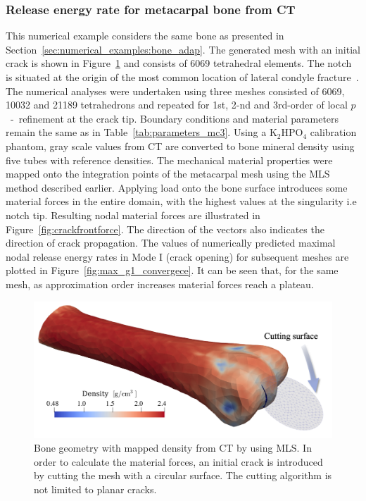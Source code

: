 \documentclass[11pt]{acmeArticle}
\numberwithin{equation}{section}
\begin{document}
\subsubsection{Release energy rate for metacarpal bone from CT}
This numerical example considers the same bone as presented in Section~\ref{sec:numerical_examples:bone_adap}. 
The generated mesh with an initial crack is shown in Figure~\ref{fig:bone_ct_mesh_cut} and consists of 6069 tetrahedral elements. 
The notch is situated at the origin of the most common location of lateral condyle fracture~\citep{jacklin2012frequency}. 
The numerical analyses were undertaken using three meshes consisted of 6069, 10032 and 21189 tetrahedrons and repeated for 1st, 2-nd and 3rd-order of local $p$~-~refinement at the crack tip. 
Boundary conditions and material parameters remain the same as in Table~\ref{tab:parameters_mc3}. 
Using a $ \mathrm {K_2 HPO_4  }$ calibration phantom, gray scale values from CT are converted to bone mineral density using five tubes with reference densities. 
The mechanical material properties were mapped onto the integration points of the metacarpal mesh using the MLS method described earlier. 
Applying load onto the bone surface introduces some material forces in the entire domain, with the highest values at the singularity i.e notch tip. 
Resulting nodal material forces are illustrated in Figure~\ref{fig:crackfrontforce}. 
The direction of the vectors also indicates the direction of crack propagation.
The values of numerically predicted maximal nodal release energy rates in Mode I (crack opening) for subsequent meshes are plotted in Figure~\ref{fig:max_g1_convergece}. 
It can be seen that, for the same mesh, as approximation order increases material forces reach a plateau. 
\begin{figure}
	\centering
	\includegraphics[width=0.5\linewidth]{Figures/bone_ct_mesh_cut.png}
	\caption{Bone geometry with mapped density from CT by using MLS. In order to calculate the material forces, an initial crack is introduced by cutting the mesh with a circular surface. The cutting algorithm is not limited to planar cracks. }
	\label{fig:bone_ct_mesh_cut}
\end{figure}
\end{document}
